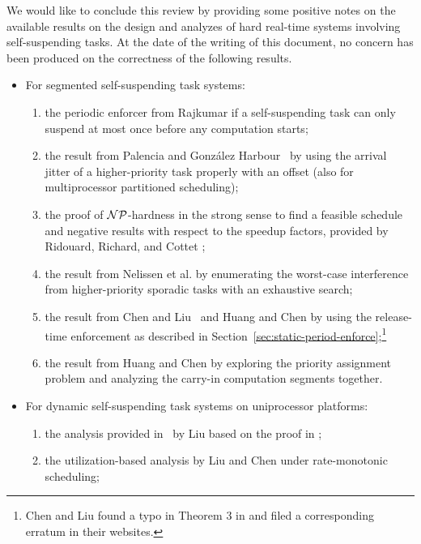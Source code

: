 We would like to conclude this review by providing some positive notes on the available results on the design and analyzes of hard real-time systems
involving self-suspending tasks.  At the date of the writing of this
document, no concern has been produced on the correctness of the following results. %
\begin{itemize}
\item For segmented self-suspending task systems: 
  \begin{enumerate}
  \item the periodic enforcer from Rajkumar \cite{Raj:suspension1991}
    if a self-suspending task
    can only suspend at most once before any computation starts;
  \item the result from Palencia and Gonz\'alez
    Harbour~\cite{PH:rtss98} by using the arrival jitter of a
    higher-priority task properly with an offset (also for
    multiprocessor partitioned scheduling);
  \item the proof of ${\cal NP}$-hardness in the strong sense to find a feasible
    schedule and negative results with respect to the speedup factors,
    provided by Ridouard, Richard, and Cottet \cite{Ridouard_2004};
  \item the result from Nelissen et al. \cite{ecrts15nelissen} by
    enumerating the worst-case interference from higher-priority
    sporadic tasks with an exhaustive search;
  \item the result from Chen and Liu~\cite{RTSS-ChenL14} and Huang and
    Chen \cite{WC16-suspend-DATE} by using the release-time
    enforcement as described in
    Section~\ref{sec:static-period-enforce};\footnote{Chen and Liu
      found a typo in Theorem 3 in \cite{RTSS-ChenL14}
      and filed a corresponding erratum in their websites.}
  \item the result from Huang and Chen \cite{Huang:multiseg} by
    exploring the priority assignment problem and analyzing the
    carry-in computation segments together.
  \end{enumerate}
\item For dynamic self-suspending task systems on uniprocessor
  platforms:
  \begin{enumerate}
  \item the analysis provided in~\cite[Pages
    164-165]{Liu:2000:RS:518501} by Liu based on the proof in \cite{ChenHuangNelissen}; 
  \item the utilization-based analysis by Liu and Chen
    \cite{LiuChen:rtss2014} under rate-monotonic scheduling;

\end{enumerate}
\end{itemize}
